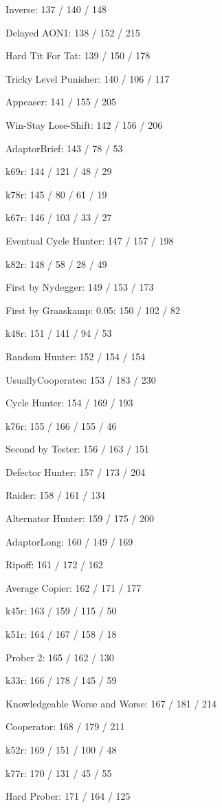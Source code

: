 \item Inverse: 137 / 140 / 148
\item Delayed AON1: 138 / 152 / 215
\item Hard Tit For Tat: 139 / 150 / 178
\item Tricky Level Punisher: 140 / 106 / 117
\item Appeaser: 141 / 155 / 205
\item Win-Stay Lose-Shift: 142 / 156 / 206
\item AdaptorBrief: 143 / 78 / 53
\item k69r: 144 / 121 / 48 / 29
\item k78r: 145 / 80 / 61 / 19
\item k67r: 146 / 103 / 33 / 27
\item Eventual Cycle Hunter: 147 / 157 / 198
\item k82r: 148 / 58 / 28 / 49
\item First by Nydegger: 149 / 153 / 173
\item First by Graaskamp: 0.05: 150 / 102 / 82
\item k48r: 151 / 141 / 94 / 53
\item Random Hunter: 152 / 154 / 154
\item UsuallyCooperates: 153 / 183 / 230
\item Cycle Hunter: 154 / 169 / 193
\item k76r: 155 / 166 / 155 / 46
\item Second by Tester: 156 / 163 / 151
\item Defector Hunter: 157 / 173 / 204
\item Raider: 158 / 161 / 134
\item Alternator Hunter: 159 / 175 / 200
\item AdaptorLong: 160 / 149 / 169
\item Ripoff: 161 / 172 / 162
\item Average Copier: 162 / 171 / 177
\item k45r: 163 / 159 / 115 / 50
\item k51r: 164 / 167 / 158 / 18
\item Prober 2: 165 / 162 / 130
\item k33r: 166 / 178 / 145 / 59
\item Knowledgeable Worse and Worse: 167 / 181 / 214
\item Cooperator: 168 / 179 / 211
\item k52r: 169 / 151 / 100 / 48
\item k77r: 170 / 131 / 45 / 55
\item Hard Prober: 171 / 164 / 125
